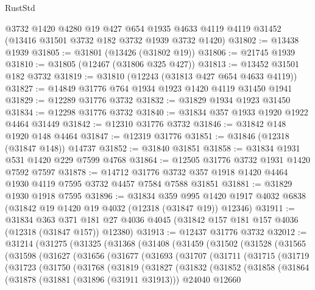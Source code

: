 \begin{lexlean}{RustStd}
\begin{coremodule}
    @3732
    @1420
    @4280
    @19
    @427
    @654
    @1935
    @4633
    @4119
    @4119
    @31452
    (@13416 @31501 @3732 @182 @3732 @1939 @3732 @1420)
@31802 := @13438 @1939
@31805 := @31801 (@13426 (@31802 @19))
@31806 := @21745 @1939
@31810 := @31805 (@12467 (@31806 @325 @427))
@31813 := @13452 @31501 @182 @3732
@31819 := @31810 (@12243 (@31813 @427 @654 @4633 @4119))
@31827 := @14849 @31776 @764 @1934 @1923 @1420 @4119 @31450 @1941
@31829 := @12289 @31776 @3732
@31832 := @31829 @1934 @1923 @31450
@31834 := @12298 @31776 @3732
@31840 := @31834 @357 @1933 @1920 @1922 @4464 @31449
@31842 := @12310 @31776 @3732
@31846 := @31842 @148 @1920 @148 @4464
@31847 := @12319 @31776
@31851 := @31846 (@12318 (@31847 @148)) @14737
@31852 := @31840 @31851
@31858 := @31834 @1931 @531 @1420 @229 @7599 @4768
@31864 := @12505 @31776 @3732 @1931 @1420 @7592 @7597
@31878 := @14712
    @31776
    @3732
    @357
    @1918
    @1420
    @4464
    @1930
    @4119
    @7595
    @3732
    @4457
    @7584
    @7588
    @31851
@31881 := @31829 @1930 @1918 @7595
@31896 := @31834
    @359
    @995
    @1420
    @1917
    @4032
    @6838
    (@31842 @19 @1420 @19 @4032 (@12318 (@31847 @19)) @12346)
@31911 := @31834
    @363
    @371
    @181
    @27
    @4036
    @4045
    (@31842 @157 @181 @157 @4036 (@12318 (@31847 @157)) @12380)
@31913 := @12437 @31776 @3732
@32012 := @31214
    (@31275
      (@31325
        (@31368
          (@31408
            (@31459
              (@31502
                (@31528
                  (@31565
                    (@31598
                      (@31627
                        (@31656
                          (@31677
                            (@31693
                              (@31707
                                (@31711
                                  (@31715
                                    (@31719
                                      (@31723
                                        (@31750
                                          (@31768
                                            (@31819
                                              (@31827
                                                (@31832
                                                  (@31852
                                                    (@31858
                                                      (@31864
                                                        (@31878
                                                          (@31881 (@31896 (@31911 @31913)))
                                                          @24040
                                                          @12660

\end{coremodule}
\end{lexlean}
